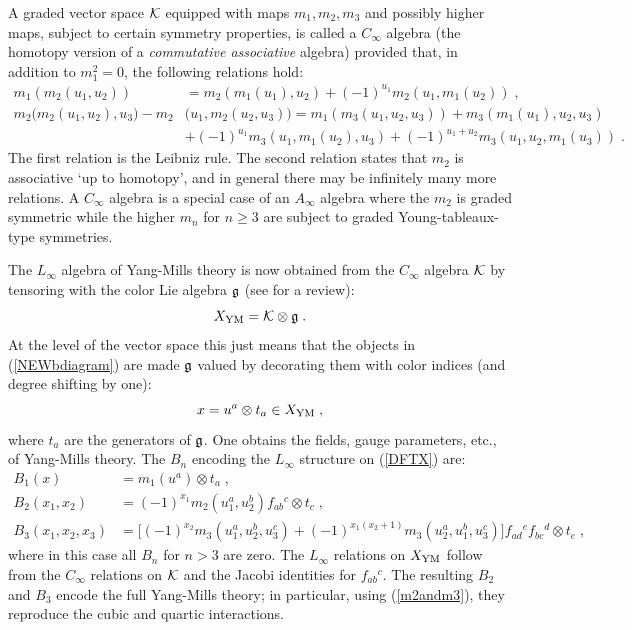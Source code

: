 \documentclass[12pt]{article}\pdfoutput=1
\def\be{\begin{equation}}
\def\ee{\end{equation}}
\begin{document}
A graded vector space ${\cal K}$ equipped with maps $m_1, m_2, m_3$ and possibly higher maps, subject 
to certain symmetry properties,  
is called a 
$C_{\infty}$ algebra (the homotopy version of a \textit{commutative associative} algebra)   
provided that, in addition to $m_1^2=0$, the following relations hold: 
\begin{equation}\label{C-relations}
\begin{split}
m_1(m_2(u_1,u_2))&=m_2(m_1(u_1),u_2)+(-1)^{u_1}m_2(u_1, m_1(u_2) )\;,\\ 
m_2\big(m_2(u_1,u_2), u_3\big)-m_2&\big(u_1,m_2(u_2,u_3)\big)=m_1(m_3(u_1,u_2,u_3))+m_3(m_1(u_1),u_2,u_3)\\
&+(-1)^{u_1}m_3(u_1,m_1(u_2),u_3)+(-1)^{u_1+u_2}m_3(u_1,u_2,m_1(u_3)) \;.
\end{split}    
\end{equation}
The first relation is the Leibniz rule. The second relation states  that $m_2$ is associative `up to homotopy', 
and in general there may be infinitely many more relations. A $C_{\infty}$ algebra is a special case of an 
$A_{\infty}$ algebra where the $m_2$ is graded symmetric while the higher $m_n$ for $n\geq 3$ are  subject 
to graded Young-tableaux-type symmetries. 


The $L_{\infty}$ algebra of Yang-Mills theory is now obtained from the $C_{\infty}$ algebra ${\cal K}$ 
by tensoring with the color Lie algebra $\frak{g}$ \cite{Zeitlin:2008cc} (see \cite{Borsten:2021hua} for a review): 
 \be\label{DFTX} 
  X_{\rm YM} = {\cal K}\otimes \frak{g}\;. 
 \ee
At the level of the vector space this just means that the objects in (\ref{NEWbdiagram}) are made $\frak{g}$ valued 
by decorating them with color indices (and degree shifting by one): 
 \be
  x = u^a\otimes t_a \in X_{\rm YM}\;, 
 \ee
where $t_a$ are the generators of  $\frak{g}$. One obtains the fields, gauge parameters, etc., 
of Yang-Mills theory. The 
$B_n$  encoding the $L_{\infty}$ structure on (\ref{DFTX})  are: 
 \be
  \begin{split}
   B_1(x) &= m_1(u^a)\otimes t_a\;, \\
   B_2(x_1,x_2) &= (-1)^{x_1} m_2(u_1^a, u_2^b) f_{ab}{}^{c} \otimes t_c\;, \\
   B_3(x_1,x_2, x_3) &= \Big[(-1)^{x_2} m_3(u_1^a, u_2^b, u_3^c) + (-1)^{x_1(x_2+1)} m_3(u_2^a, u_1^b, u_3^c)\Big] 
   f_{ad}{}^{e} f_{bc}{}^{d} \otimes t_{e} \;, 
     \end{split}
 \ee 
where  in this case 
all $B_n$ for $n>3$ are zero.  
The $L_{\infty}$  relations on $X_{\rm YM}$  follow from the $C_{\infty}$ relations on ${\cal K}$ 
and the Jacobi identities for $f_{ab}{}^{c}$. The resulting $B_2$ and $B_3$ encode the full Yang-Mills theory; 
in particular, using (\ref{m2andm3}), they reproduce the cubic and quartic interactions. 
\end{document}
